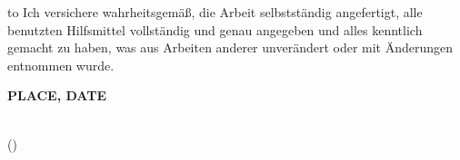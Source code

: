 

\thispagestyle{empty}
\null\vfill
\noindent\hbox to \textwidth{\hrulefill}
%
{Ich versichere wahrheitsgemäß, die Arbeit
selbstständig angefertigt, alle benutzten Hilfsmittel vollständig und genau
angegeben und alles kenntlich gemacht zu haben, was aus Arbeiten anderer
unverändert oder mit Änderungen entnommen wurde.}


\textbf{PLACE, DATE}
\vspace{1.5cm}

\dotfill\hspace*{8.0cm}\\
\hspace*{2cm}(\theauthor)
\cleardoublepage
